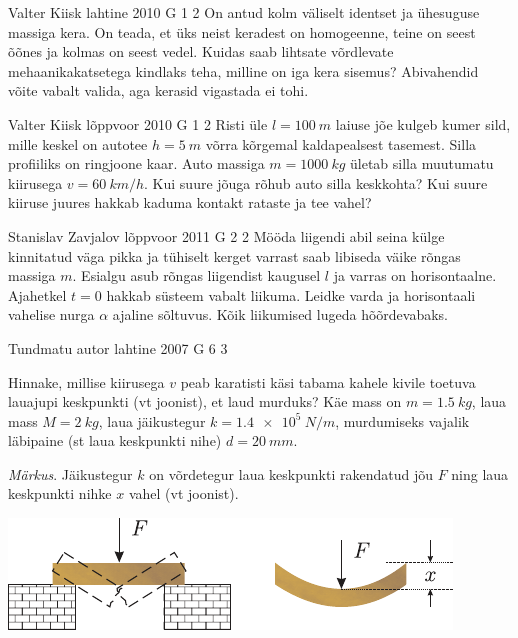 \documentclass[11pt, twoside]{article}
\begin{document}
{%
{Valter Kiisk} %
{lahtine} %
{2010} %
{G 1} %
{2} %
{
\ifStatement
On antud kolm väliselt identset ja ühesuguse massiga kera. On teada, et üks
neist keradest on homogeenne, teine on seest õõnes ja kolmas on seest vedel.
Kuidas saab lihtsate võrdlevate mehaanikakatsetega kindlaks teha, milline on iga
kera sisemus? Abivahendid võite vabalt valida, aga kerasid vigastada ei tohi.
\fi
}

{Valter Kiisk} %
{lõppvoor} %
{2010} %
{G 1} %
{2} %
{
\ifStatement
Risti üle $l=\SI{100}{m}$ laiuse jõe kulgeb kumer sild, mille keskel on
autotee $h=\SI{5}{m}$ võrra kõrgemal kaldapealsest tasemest. Silla profiiliks on
ringjoone kaar. Auto massiga $m=\SI{1000}{kg}$ ületab silla muutumatu kiirusega $v=\SI{60}{km/h}$.
Kui suure jõuga rõhub auto silla keskkohta? Kui suure kiiruse juures hakkab kaduma
kontakt rataste ja tee vahel?
\fi
}

{Stanislav Zavjalov} %
{lõppvoor} %
{2011} %
{G 2} %
{2} %
{
\ifStatement
Mööda liigendi abil seina külge kinnitatud väga pikka ja tühiselt
kerget varrast saab libiseda väike rõngas massiga $m$. Esialgu asub rõngas liigendist kaugusel $l$ ja varras on horisontaalne. Ajahetkel $t = \num{0}$ hakkab süsteem
vabalt liikuma. Leidke varda ja horisontaali vahelise nurga $\alpha$ ajaline sõltuvus.
Kõik liikumised lugeda hõõrdevabaks. 
\fi
}

{Tundmatu autor} %
{lahtine} %
{2007} %
{G 6} %
{3} %
{
\ifStatement
Hinnake, millise kiirusega $v$ peab karatisti käsi tabama kahele kivile toetuva lauajupi keskpunkti (vt joonist), et laud murduks? Käe mass on $m = \SI{1,5}{kg}$, laua mass $M = \SI{2}{kg}$, laua jäikustegur $k = \SI{1,4e5}{N/m}$, murdumiseks vajalik läbipaine (st laua keskpunkti nihe) $d = \SI{20}{mm}$. 

\emph{Märkus}. Jäikustegur $k$ on võrdetegur laua keskpunkti rakendatud jõu $F$ ning laua keskpunkti nihke $x$ vahel (vt joonist).

\begin{center}
	\includegraphics[width=0.8\linewidth]{2007-lahg-06-yl}
\end{center}
\fi
}

}
\end{document}
